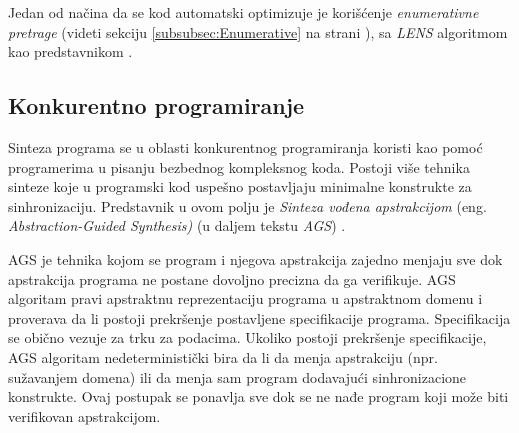Jedan od načina da se kod automatski optimizuje je korišćenje  \emph{enumerativne pretrage} (videti sekciju \ref{subsubsec:Enumerative} na strani \pageref{subsubsec:Enumerative}), sa \emph{LENS} algoritmom kao predstavnikom \cite{ScalingUpSuperoptimization}.


\subsection{Konkurentno programiranje}
\label{subsec:KonkurentnoProgramiranje}

Sinteza programa se u oblasti konkurentnog programiranja koristi kao pomoć programerima u pisanju bezbednog kompleksnog koda. Postoji više tehnika sinteze koje u programski kod uspešno postavljaju minimalne konstrukte za sinhronizaciju. Predstavnik u ovom polju je \emph{Sinteza vođena apstrakcijom} (eng. \emph{Abstraction-Guided Synthesis)} (u daljem tekstu \emph{AGS})  \cite{AGS}.

AGS je tehnika kojom se program i njegova apstrakcija zajedno menjaju sve dok apstrakcija programa ne postane dovoljno precizna da ga verifikuje. AGS algoritam pravi apstraktnu reprezentaciju programa u apstraktnom domenu i proverava da li postoji prekršenje postavljene specifikacije programa. Specifikacija se obično vezuje za trku za podacima. Ukoliko postoji prekršenje specifikacije, AGS algoritam nedeterministički bira da li da menja apstrakciju (npr. sužavanjem domena) ili da menja sam program dodavajući sinhronizacione konstrukte. Ovaj postupak se ponavlja sve dok se ne nađe program koji može biti verifikovan apstrakcijom.
